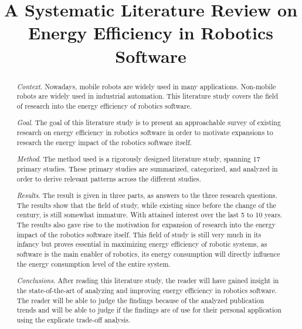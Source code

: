 \documentclass[10pt, conference, compsocconf]{IEEEtran}
\begin{document}
\title{
	{A Systematic Literature Review on Energy Efficiency in Robotics Software}
}

\author{

\vspace{5mm}

}


\maketitle

\begin{abstract}
\noindent \textit{Context}. 
Nowadays, mobile robots are widely used in many applications. Non-mobile robots are widely used in industrial automation.
This literature study covers the field of research into the energy efficiency of robotics software.

\noindent \textit{Goal}. 
The goal of this literature study is to present an approachable survey of existing research on energy efficiency in robotics software
in order to motivate expansions to research the energy impact of the robotics software itself.

\noindent \textit{Method}. 
The method used is a rigorously designed literature study, spanning 17 primary studies. 
These primary studies are summarized, categorized, and analyzed in order to derive relevant patterns across the different studies.

\noindent \textit{Results}. 
The result is given in three parts, as answers to the three research questions. 
The results show that the field of study, while existing since before the change of the century, is still somewhat immature.
With attained interest over the last 5 to 10 years.
The results also gave rise to the motivation for expansion of research into the energy impact of the robotics software itself.
This field of study is still very much in its infancy but proves essential in maximizing energy efficiency of robotic systems, 
as software is the main enabler of robotics, its energy consumption will directly inﬂuence the energy consumption level of the
entire system.

\noindent \textit{Conclusions}.
After reading this literature study, the reader will have gained insight in the state-of-the-art of analyzing and 
improving energy efficiency in robotics software. The reader will be able to judge the findings because of the analyzed publication trends
and will be able to judge if the findings are of use for their personal application using the explicate trade-off analysis.
\end{abstract}
\end{document}
